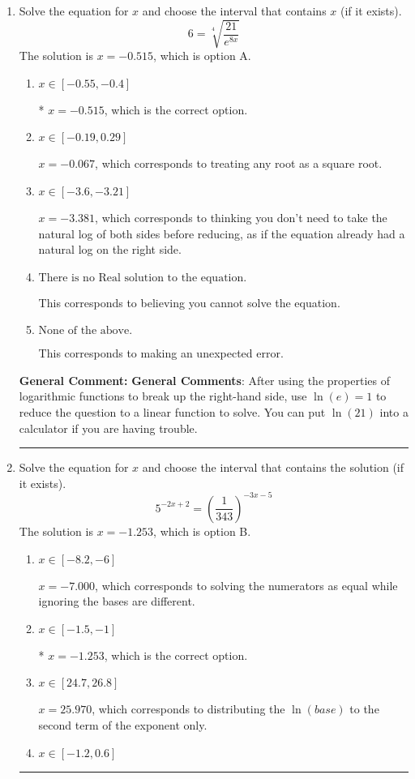 \documentclass{extbook}[14pt]
\newcommand{\litem}[1]{\item #1

\rule{\textwidth}{0.4pt}}
\begin{document}
\begin{enumerate}\litem{
 Solve the equation for $x$ and choose the interval that contains $x$ (if it exists).
\[  6 = \sqrt[4]{\frac{21}{e^{8x}}} \]The solution is \( x = -0.515 \), which is option A.\begin{enumerate}[label=\Alph*.]
\item \( x \in [-0.55, -0.4] \)

* $x = -0.515$, which is the correct option.
\item \( x \in [-0.19, 0.29] \)

$x = -0.067$, which corresponds to treating any root as a square root.
\item \( x \in [-3.6, -3.21] \)

$x = -3.381$, which corresponds to thinking you don't need to take the natural log of both sides before reducing, as if the equation already had a natural log on the right side.
\item \( \text{There is no Real solution to the equation.} \)

This corresponds to believing you cannot solve the equation.
\item \( \text{None of the above.} \)

This corresponds to making an unexpected error.
\end{enumerate}

\textbf{General Comment:} \textbf{General Comments}: After using the properties of logarithmic functions to break up the right-hand side, use $\ln(e) = 1$ to reduce the question to a linear function to solve. You can put $\ln(21)$ into a calculator if you are having trouble.
}
\litem{
Solve the equation for $x$ and choose the interval that contains the solution (if it exists).
\[ 5^{-2x+2} = \left(\frac{1}{343}\right)^{-3x-5} \]The solution is \( x = -1.253 \), which is option B.\begin{enumerate}[label=\Alph*.]
\item \( x \in [-8.2, -6] \)

$x = -7.000$, which corresponds to solving the numerators as equal while ignoring the bases are different.
\item \( x \in [-1.5, -1] \)

* $x = -1.253$, which is the correct option.
\item \( x \in [24.7, 26.8] \)

$x = 25.970$, which corresponds to distributing the $\ln(base)$ to the second term of the exponent only.
\item \( x \in [-1.2, 0.6] \)


\end{enumerate}}
\end{enumerate}
\end{document}
